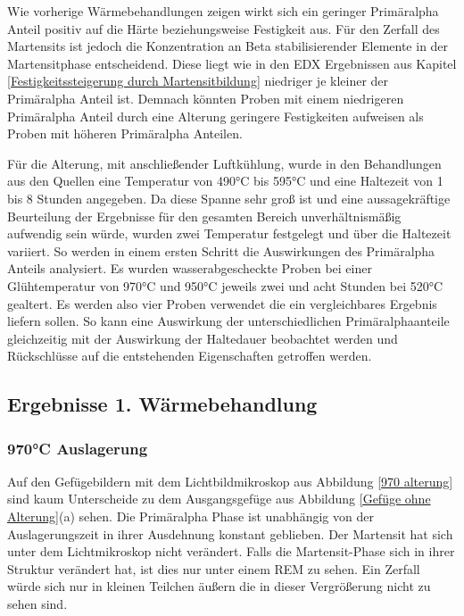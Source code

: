 \documentclass[a4paper, 11pt]{tubsreprt}
\begin{document}
Wie vorherige Wärmebehandlungen zeigen wirkt sich ein geringer Primäralpha Anteil positiv auf die Härte beziehungsweise Festigkeit aus. Für den Zerfall des Martensits ist jedoch die Konzentration an Beta stabilisierender Elemente in der Martensitphase entscheidend. Diese liegt wie in den EDX Ergebnissen aus Kapitel \ref{Festigkeitssteigerung durch Martensitbildung} niedriger je kleiner der Primäralpha Anteil ist. Demnach könnten Proben mit einem niedrigeren Primäralpha Anteil durch eine Alterung geringere Festigkeiten aufweisen als Proben mit höheren Primäralpha Anteilen.

Für die Alterung, mit anschließender Luftkühlung, wurde in den Behandlungen aus den Quellen eine Temperatur von 490°C bis 595°C und eine Haltezeit von 1 bis 8 Stunden angegeben. Da diese Spanne sehr groß ist und eine aussagekräftige Beurteilung der Ergebnisse für den gesamten Bereich unverhältnismäßig aufwendig sein würde, wurden zwei Temperatur festgelegt und über die Haltezeit variiert. So werden in einem ersten Schritt die Auswirkungen des Primäralpha Anteils analysiert. Es wurden wasserabgescheckte Proben bei einer Glühtemperatur von 970°C und 950°C jeweils zwei und acht Stunden bei 520°C gealtert. Es werden also vier Proben verwendet die ein vergleichbares Ergebnis liefern sollen. So kann eine Auswirkung der unterschiedlichen Primäralphaanteile gleichzeitig mit der Auswirkung der Haltedauer beobachtet werden und Rückschlüsse auf die entstehenden Eigenschaften getroffen werden.
\subsection{Ergebnisse 1. Wärmebehandlung}
\subsubsection{970°C Auslagerung}
Auf den Gefügebildern mit dem Lichtbildmikroskop aus Abbildung \ref{970 alterung} sind kaum Unterscheide zu dem Ausgangsgefüge aus Abbildung \ref{Gefüge ohne Alterung}(a) sehen. Die Primäralpha Phase ist unabhängig von der Auslagerungszeit in ihrer Ausdehnung konstant geblieben. Der Martensit hat sich unter dem Lichtmikroskop nicht verändert. Falls die Martensit-Phase sich in ihrer Struktur verändert hat, ist dies nur unter einem REM zu sehen. Ein Zerfall würde sich nur in kleinen Teilchen äußern die in dieser Vergrößerung nicht zu sehen sind. 
\end{document}
